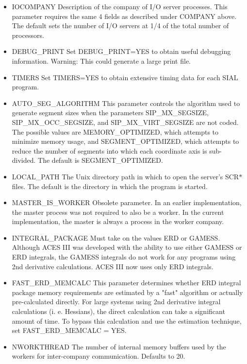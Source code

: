 \documentclass[12pt]{article}
\begin{document}
\begin{itemize}
\item IOCOMPANY Description of the company of I/O server processes. This parameter requires the
                same 4 fields as described under COMPANY above. The default sets the number of 
                I/O servers at 1/4 of the total number of processors.
\item DEBUG\_PRINT Set DEBUG\_PRINT=YES to obtain useful debugging information. Warning: This 
                  could generate a large print file.
\item TIMERS Set TIMERS=YES to obtain extensive timing data for each SIAL program. 
\item AUTO\_SEG\_ALGORITHM This parameter controls the algorithm used
  to generate segment sizes when the parameters SIP\_MX\_SEGSIZE, 
  SIP\_MX\_OCC\_SEGSIZE, and SIP\_MX\_VIRT\_SEGSIZE are not
  coded. The possible values are MEMORY\_OPTIMIZED, which attempts to
  minimize memory usage, and SEGMENT\_OPTIMIZED, which attempts to
  reduce the number of segments into which each coordinate axis is
  sub-divided. The default is SEGMENT\_OPTIMIZED.
\item LOCAL\_PATH The Unix directory path in which to open the server's SCR$*$ files. The default
                 is the directory in which the program is started.
\item MASTER\_IS\_WORKER Obsolete parameter. In an earlier implementation, the master process 
                                           was not required to also be a worker. In the current
                                           implementation, the master is always a process in 
                                           the worker company.
\item INTEGRAL\_PACKAGE Must take on the values ERD or GAMESS.  Although ACES III was 
                       developed with the ability to use either GAMESS or ERD integrals, the 
                       GAMESS integrals do not work for any programs using 2nd derivative 
                       calculations. ACES III now uses only ERD integrals.
\item FAST\_ERD\_MEMCALC This parameter determines whether ERD integral package memory 
                       requirements are estimated by a "fast" algorithm or actually 
                       pre-calculated directly. For large systems using 2nd derivative 
                       integral calculations (i. e. Hessians), the direct calculation can take
                       a significant amount of time. To bypass this calculation and use the 
                       estimation technique, set FAST\_ERD\_MEMCALC = YES.
\item NWORKTHREAD The number of internal memory buffers used by the workers for inter-company 
                  communication. Defaults to 20.
\end{itemize} 
 
\end{document}
